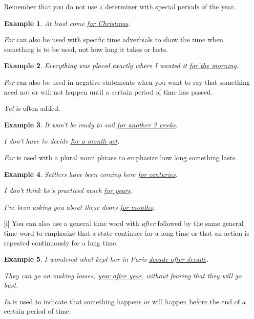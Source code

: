\documentclass[oneside]{book}
\numberwithin{equation}{section}
\newtheorem{example}{Example}[section]
\begin{document}
Remember that you do not use a determiner with special periods of the year.
\begin{example}
    At least come \underline{for Christmas}.
\end{example}
%
\noindent{} \textit{For} can also be used with specific time adverbials to show the time when something is to be used, not how long it takes or lasts.
\begin{example}
    Everything was placed exactly where I wanted it \underline{for the morning}.
\end{example}
%
\noindent{} \textit{For} can also be used in negative statements when you want to say that something need not or will not happen until a certain period of time has passed.

\textit{Yet} is often added.
\begin{example}
    It won't be ready to sail \underline{for another 3 weeks}.
    
    I don't have to decide \underline{for a month yet}.
\end{example}
%
\noindent{} \textit{For} is used with a plural noun phrase to emphasize how long something lasts.
\begin{example}
    Settlers have been coming here \underline{for centuries}.
    
    I don't think he's practiced much \underline{for years}.
    
    I've been asking you about these doors \underline{for months}.
\end{example}
%
\noindent{} [i] You can also use a general time word with \textit{after} followed by the same general time word to emphasize that a state continues for a long time or that an action is repeated continuously for a long time.
\begin{example}
    I wondered what kept her in Paris \underline{decade after decade}.
    
    They can go on making losses, \underline{year after year}, without fearing that they will go bust.
\end{example}
%
\noindent{} \textit{In} is used to indicate that something happens or will happen before the end of a certain period of time.
\end{document}
